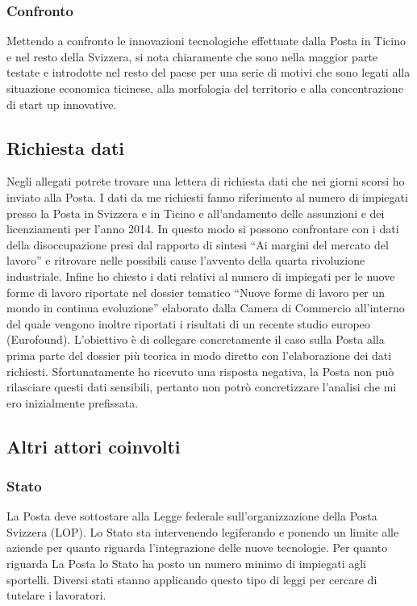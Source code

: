 \subsubsection{Confronto}
Mettendo a confronto le innovazioni tecnologiche effettuate dalla Posta in Ticino e nel resto della Svizzera, si nota chiaramente che sono nella maggior parte testate e introdotte nel resto del paese per una serie di motivi che sono legati alla situazione economica ticinese, alla morfologia del territorio e alla concentrazione di start up innovative.
\subsection{Richiesta dati}
Negli allegati potrete trovare una lettera di richiesta dati che nei giorni scorsi ho inviato alla Posta. I dati da me richiesti fanno riferimento al numero di impiegati presso la Posta in Svizzera e in Ticino e all’andamento delle assunzioni e dei licenziamenti per l’anno 2014. In questo modo si possono confrontare con i dati della disoccupazione presi dal rapporto di sintesi “Ai margini del mercato del lavoro” e ritrovare nelle possibili cause l’avvento della quarta rivoluzione industriale. Infine ho chiesto i dati relativi al numero di impiegati per le nuove forme di lavoro riportate nel dossier tematico “Nuove forme di lavoro per un mondo in continua evoluzione” elaborato dalla Camera di Commercio all’interno del quale vengono inoltre riportati i risultati di un recente studio europeo (Eurofound). L’obiettivo è di collegare concretamente il caso sulla Posta alla prima parte del dossier più teorica in modo diretto con l’elaborazione dei dati richiesti. Sfortunatamente ho ricevuto una risposta negativa, la Posta non può rilasciare questi dati sensibili, pertanto non potrò concretizzare l’analisi che mi ero inizialmente prefissata.
\subsection{Altri attori coinvolti}
\subsubsection{Stato}
La Posta deve sottostare alla Legge federale sull’organizzazione della Posta Svizzera (LOP). 
Lo Stato sta intervenendo legiferando e ponendo un limite alle aziende per quanto riguarda l’integrazione delle nuove tecnologie. Per quanto riguarda La Posta lo Stato ha posto un numero minimo di impiegati agli sportelli. Diversi stati stanno applicando questo tipo di leggi per cercare di tutelare i lavoratori.

